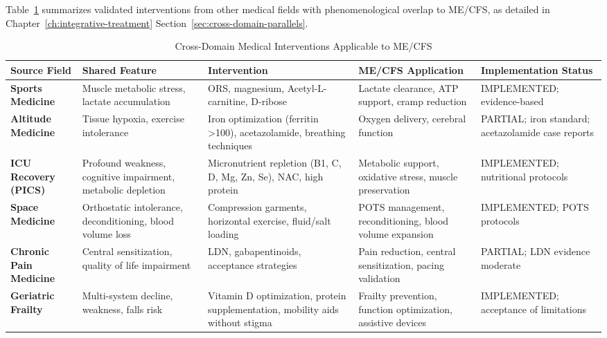 Table~\ref{tab:cross-domain-parallels} summarizes validated interventions from other medical fields with phenomenological overlap to ME/CFS, as detailed in Chapter~\ref{ch:integrative-treatment} Section~\ref{sec:cross-domain-parallels}.

\begin{table}[htbp]
\centering
\caption{Cross-Domain Medical Interventions Applicable to ME/CFS}
\label{tab:cross-domain-parallels}
\scriptsize
\begin{tabular}{p{2.5cm}p{2cm}p{3.5cm}p{3cm}p{2.5cm}}
\toprule
\textbf{Source Field} & \textbf{Shared Feature} & \textbf{Intervention} & \textbf{ME/CFS Application} & \textbf{Implementation Status} \\
\midrule
\textbf{Sports Medicine} & Muscle metabolic stress, lactate accumulation & ORS, magnesium, Acetyl-L-carnitine, D-ribose & Lactate clearance, ATP support, cramp reduction & IMPLEMENTED; evidence-based \\
\midrule
\textbf{Altitude Medicine} & Tissue hypoxia, exercise intolerance & Iron optimization (ferritin >100), acetazolamide, breathing techniques & Oxygen delivery, cerebral function & PARTIAL; iron standard; acetazolamide case reports \\
\midrule
\textbf{ICU Recovery (PICS)} & Profound weakness, cognitive impairment, metabolic depletion & Micronutrient repletion (B1, C, D, Mg, Zn, Se), NAC, high protein & Metabolic support, oxidative stress, muscle preservation & IMPLEMENTED; nutritional protocols \\
\midrule
\textbf{Space Medicine} & Orthostatic intolerance, deconditioning, blood volume loss & Compression garments, horizontal exercise, fluid/salt loading & POTS management, reconditioning, blood volume expansion & IMPLEMENTED; POTS protocols \\
\midrule
\textbf{Chronic Pain Medicine} & Central sensitization, quality of life impairment & LDN, gabapentinoids, acceptance strategies & Pain reduction, central sensitization, pacing validation & PARTIAL; LDN evidence moderate \\
\midrule
\textbf{Geriatric Frailty} & Multi-system decline, weakness, falls risk & Vitamin D optimization, protein supplementation, mobility aids without stigma & Frailty prevention, function optimization, assistive devices & IMPLEMENTED; acceptance of limitations \\
\bottomrule
\end{tabular}
\end{table}

